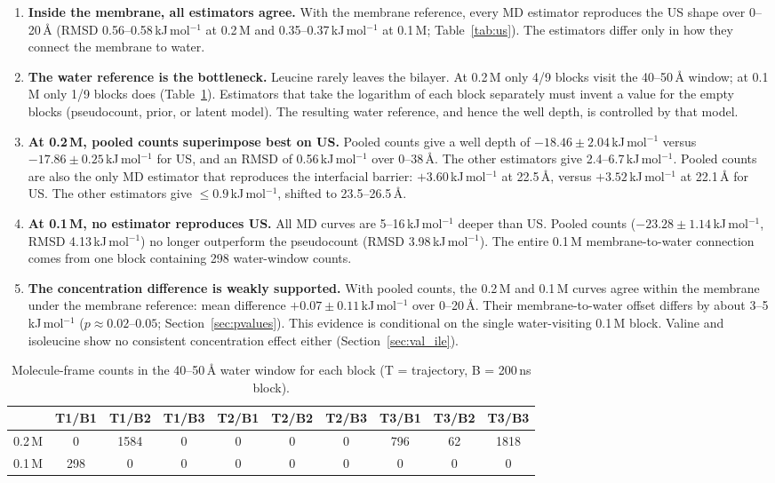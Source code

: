 \documentclass[11pt,a4paper]{article}
\newcommand{\kJ}{\,kJ\,mol$^{-1}$}
\begin{document}
\begin{enumerate}
  \item \textbf{Inside the membrane, all estimators agree.} With the membrane reference, every
  MD estimator reproduces the US shape over 0--20\,\AA{} (RMSD 0.56--0.58\kJ{} at 0.2\,M and
  0.35--0.37\kJ{} at 0.1\,M; Table~\ref{tab:us}). The estimators differ only in how they
  connect the membrane to water.
  \item \textbf{The water reference is the bottleneck.} Leucine rarely leaves the bilayer. At
  0.2\,M only 4/9 blocks visit the 40--50\,\AA{} window; at 0.1\,M only 1/9 blocks does
  (Table~\ref{tab:water}). Estimators that take the logarithm of each block separately must
  invent a value for the empty blocks (pseudocount, prior, or latent model). The resulting
  water reference, and hence the well depth, is controlled by that model.
  \item \textbf{At 0.2\,M, pooled counts superimpose best on US.} Pooled counts give a well depth
  of $-18.46 \pm 2.04$\kJ{} versus $-17.86 \pm 0.25$\kJ{} for US, and an RMSD of 0.56\kJ{} over
  0--38\,\AA{}. The other estimators give 2.4--6.7\kJ. Pooled counts are also the only MD
  estimator that reproduces the interfacial barrier: $+3.60$\kJ{} at 22.5\,\AA{}, versus
  $+3.52$\kJ{} at 22.1\,\AA{} for US. The other estimators give $\le 0.9$\kJ, shifted to 23.5--26.5\,\AA.
  \item \textbf{At 0.1\,M, no estimator reproduces US.} All MD curves are 5--16\kJ{} deeper
  than US. Pooled counts ($-23.28 \pm 1.14$\kJ, RMSD 4.13\kJ) no longer outperform the
  pseudocount (RMSD 3.98\kJ). The entire 0.1\,M membrane-to-water connection comes from
  one block containing 298 water-window counts.
  \item \textbf{The concentration difference is weakly supported.} With pooled counts, the
  0.2\,M and 0.1\,M curves agree within the membrane under the membrane reference: mean
  difference $+0.07 \pm 0.11$\kJ{} over 0--20\,\AA. Their membrane-to-water offset differs
  by about 3--5\kJ{} ($p \approx 0.02$--$0.05$; Section~\ref{sec:pvalues}). This evidence is
  conditional on the single water-visiting 0.1\,M block. Valine and isoleucine show no
  consistent concentration effect either (Section~\ref{sec:val_ile}).
\end{enumerate}

\begin{table}[H]
\centering
\caption{Molecule-frame counts in the 40--50\,\AA{} water window for each block
(T = trajectory, B = 200\,ns block).}
\label{tab:water}
\begin{tabular}{lccccccccc}
\toprule
 & T1/B1 & T1/B2 & T1/B3 & T2/B1 & T2/B2 & T2/B3 & T3/B1 & T3/B2 & T3/B3 \\
\midrule
0.2\,M & 0 & 1584 & 0 & 0 & 0 & 0 & 796 & 62 & 1818 \\
0.1\,M & 298 & 0 & 0 & 0 & 0 & 0 & 0 & 0 & 0 \\
\bottomrule
\end{tabular}
\end{table}
\end{document}
